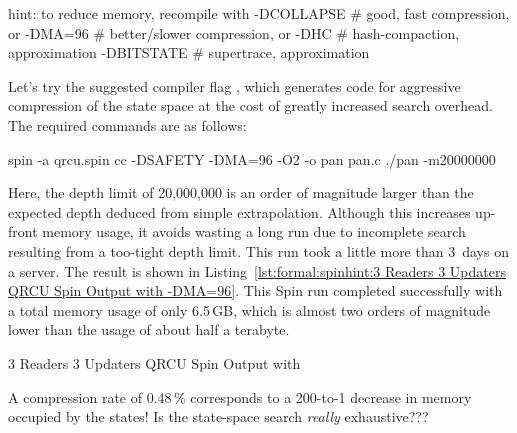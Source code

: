 \begin{VerbatimU}
hint: to reduce memory, recompile with
  -DCOLLAPSE # good, fast compression, or
  -DMA=96   # better/slower compression, or
  -DHC # hash-compaction, approximation
  -DBITSTATE # supertrace, approximation
\end{VerbatimU}

Let's try the suggested compiler flag ,
which generates code for aggressive compression of the
state space at the cost of greatly increased search overhead.
The required commands are as follows:

\begin{VerbatimU}
spin -a qrcu.spin
cc -DSAFETY -DMA=96 -O2 -o pan pan.c
./pan -m20000000
\end{VerbatimU}

Here, the depth limit of 20,000,000 is an order of magnitude
larger than the expected depth deduced from simple extrapolation.
Although this increases up-front memory usage, it avoids wasting
a long run due to incomplete search resulting from a too-tight
depth limit.
This run took a little more than 3~days on a  server.
The result is shown in
Listing~\ref{lst:formal:spinhint:3 Readers 3 Updaters QRCU Spin Output with -DMA=96}.
This Spin run completed successfully with a total memory
usage of only 6.5\,GB, which is almost two orders of magnitude
lower than the  usage of about half a terabyte.

\begin{listing}
\vspace*{-9pt}
\caption{3 Readers 3 Updaters QRCU Spin Output with }
\label{lst:formal:spinhint:3 Readers 3 Updaters QRCU Spin Output with -DMA=96}
\end{listing}

\QuickQuiz{}
	A compression rate of 0.48\,\% corresponds to a 200-to-1 decrease
	in memory occupied by the states!
	Is the state-space search \emph{really} exhaustive???
 \QuickQuizEnd

